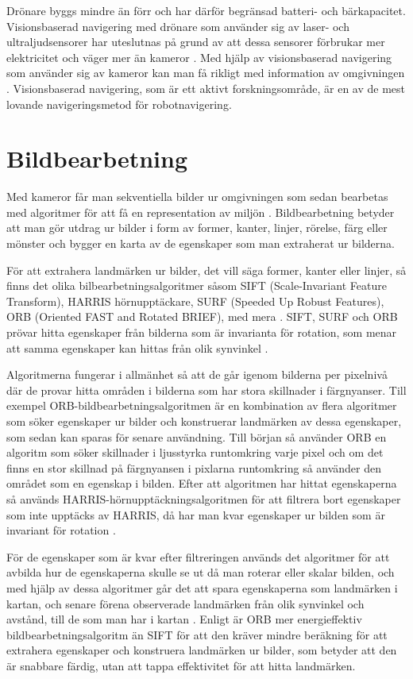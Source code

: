 Drönare byggs mindre än förr och har därför begränsad batteri- och bärkapacitet. Visionsbaserad navigering med drönare som använder sig av laser- och ultraljudsensorer har uteslutnas på grund av att dessa sensorer förbrukar mer elektricitet och väger mer än kameror \citep{6385934}. Med hjälp av visionsbaserad navigering som använder sig av kameror kan man få rikligt med information av omgivningen \citep{geospatial}. Visionsbaserad navigering, som är ett aktivt forskningsområde, är en av de mest lovande navigeringsmetod för robotnavigering.

\section{Bildbearbetning}

Med kameror får man sekventiella bilder ur omgivningen som sedan bearbetas med algoritmer för att få en representation av miljön \citep{982903}. Bildbearbetning betyder att man gör utdrag ur bilder i form av former, kanter, linjer, rörelse, färg eller mönster och bygger en karta av de egenskaper som man extraherat ur bilderna. 

För att extrahera landmärken ur bilder, det vill säga former, kanter eller linjer, så finns det olika bilbearbetningsalgoritmer såsom SIFT (Scale-Invariant Feature Transform), HARRIS hörnupptäckare, SURF (Speeded Up Robust Features), ORB (Oriented FAST and Rotated BRIEF), med mera \citep{orb, slamproblem, mapbuildingsift}. SIFT, SURF och ORB prövar hitta egenskaper från bilderna som är invarianta för rotation, som menar att samma egenskaper kan hittas från olik synvinkel \citep{orb}. 

Algoritmerna fungerar i allmänhet så att de går igenom bilderna per pixelnivå där de provar hitta områden i bilderna som har stora skillnader i färgnyanser. Till exempel ORB-bildbearbetningsalgoritmen är en kombination av flera algoritmer som söker egenskaper ur bilder och konstruerar landmärken av dessa egenskaper, som sedan kan sparas för senare användning. 
Till början så använder ORB en algoritm som söker skillnader i ljusstyrka runtomkring varje pixel och om det finns en stor skillnad på färgnyansen i pixlarna runtomkring så använder den området som en egenskap i bilden. Efter att algoritmen har hittat egenskaperna så används HARRIS-hörnupptäckningsalgoritmen för att filtrera bort egenskaper som inte upptäcks av HARRIS, då har man kvar egenskaper ur bilden som är invariant för rotation \citep{orb}. 

För de egenskaper som är kvar efter filtreringen används det algoritmer för att avbilda hur de egenskaperna skulle se ut då man roterar eller skalar bilden, och med hjälp av dessa algoritmer går det att spara egenskaperna som landmärken i kartan, och senare förena observerade landmärken från olik synvinkel och avstånd, till de som man har i kartan \citep{orb}. Enligt \cite{orb} är ORB mer energieffektiv bildbearbetningsalgoritm än SIFT för att den kräver mindre beräkning för att extrahera egenskaper och konstruera landmärken ur bilder, som betyder att den är snabbare färdig, utan att tappa effektivitet för att hitta landmärken.

